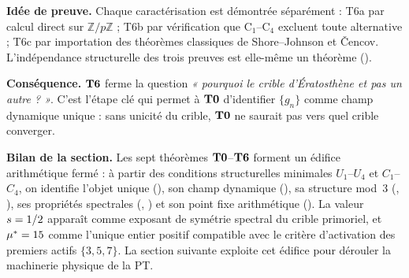 \textbf{Idée de preuve.} Chaque caractérisation est démontrée séparément : T6a par calcul direct sur $\mathbb{Z}/p\mathbb{Z}$ ; T6b par vérification que C$_1$--C$_4$ excluent toute alternative ; T6c par importation des théorèmes classiques de Shore--Johnson et \v{C}encov. L'indépendance structurelle des trois preuves est elle-même un théorème (\cite[Thm.~T6\_independence, ch.~02]{PT_Monograph}).

\textbf{Conséquence.} $\textbf{T6}$ ferme la question \emph{« pourquoi le crible d'Ératosthène et pas un autre ? »}. C'est l'étape clé qui permet à $\textbf{T0}$ d'identifier $\{g_n\}$ comme champ dynamique unique : sans unicité du crible, $\textbf{T0}$ ne saurait pas vers quel crible converger.

\bigskip\noindent\textbf{Bilan de la section.} Les sept théorèmes $\textbf{T0}$--$\textbf{T6}$ forment un édifice arithmétique fermé : à partir des conditions structurelles minimales $U_1$--$U_4$ et $C_1$--$C_4$, on identifie l'objet unique (\Tsix), son champ dynamique (\Tzero), sa structure mod~$3$ (\Tone, \Tthree), ses propriétés spectrales (\Ttwo, \Tfour) et son point fixe arithmétique (\Tfive). La valeur $s = 1/2$ apparaît comme exposant de symétrie spectral du crible primoriel, et $\mu^{*} = 15$ comme l'unique entier positif compatible avec le critère d'activation des premiers actifs $\{3,5,7\}$. La section suivante exploite cet édifice pour dérouler la machinerie physique de la PT.
